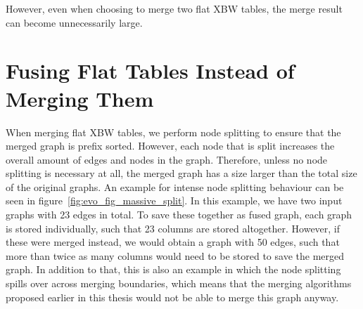 \documentclass[a4paper,12pt,twoside,BCOR=10mm]{scrbook}
\begin{document}
However, even when choosing to merge two flat XBW tables, 
the merge result can become unnecessarily large.


\section{Fusing Flat Tables Instead of Merging Them}
%

When merging flat XBW tables, we perform node splitting to ensure that the 
merged graph is prefix sorted. 
However, each node that is split increases the overall amount of edges 
and nodes in the graph. 
Therefore, unless no node splitting is necessary at all, 
the merged graph has a size larger than the total size of the 
original graphs. An example for intense node splitting behaviour can 
be seen in figure~\ref{fig:evo_fig_massive_split}. 
In this example, we have two input graphs with 23 edges in total. 
To save these together as fused graph, each graph is stored individually, 
such that 23 columns are stored altogether. 
However, if these were merged instead, we would obtain a graph with 50 edges, 
such that more than twice as many columns would need to be stored to save the 
merged graph. 
In addition to that, this is also an example in which the node splitting spills over 
across merging boundaries, which means that the merging algorithms proposed earlier 
in this thesis would not be able to merge this graph anyway.
\end{document}
